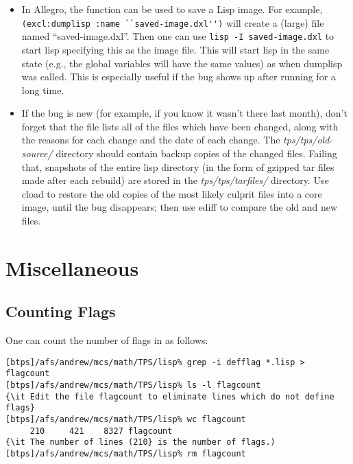 \begin{itemize}
\item In Allegro, the function  can be used to save a Lisp image.
For example,
\verb+(excl:dumplisp :name ``saved-image.dxl'')+
will create a (large) file named ``saved-image.dxl''.  Then one can
use \verb+lisp -I saved-image.dxl+
to start lisp specifying this as the image file.
This will start lisp in the same
state (e.g., the global variables will have the same values)
as when dumplisp was called.  This is especially useful if the
bug shows up after running for a long time.

\item If the bug is new (for example, if you know it wasn't there last month), don't forget 
that the {\it {}} file lists all of the files which have been changed, along 
with the reasons for each change and the date of each change. The {\it tps/tps/old-source/} directory
should contain backup copies of the changed files. Failing that, snapshots of the entire 
lisp directory (in the form of gzipped tar files made after each rebuild) are stored 
in the {\it tps/tps/tarfiles/} directory. Use cload to restore the old copies of the most likely
culprit files into a core image, until the bug disappears; then use ediff to
compare the old and new files.
\end{itemize}

\section{Miscellaneous}

\subsection{Counting Flags}

One can count the number of flags in \TPS as follows:

\begin{verbatim}
[btps]/afs/andrew/mcs/math/TPS/lisp% grep -i defflag *.lisp > flagcount
[btps]/afs/andrew/mcs/math/TPS/lisp% ls -l flagcount
{\it Edit the file flagcount to eliminate lines which do not define flags}
[btps]/afs/andrew/mcs/math/TPS/lisp% wc flagcount
     210     421    8327 flagcount
{\it The number of lines (210} is the number of flags.)
[btps]/afs/andrew/mcs/math/TPS/lisp% rm flagcount
\end{verbatim}


